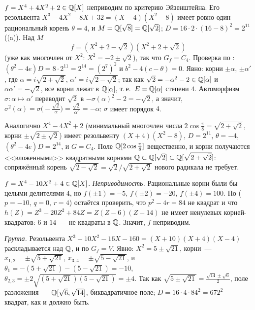 \begin{example}[4.11]
$f=X^4+4X^2+2\in\mathbb Q[X]$ неприводим по критерию Эйзенштейна. Его резольвента $X^3-4X^2-8X+32=(X-4)(X^2-8)$ имеет ровно
один рациональный корень $\theta=4$, и $M=\mathbb Q[\sqrt8]=\mathbb Q[\sqrt2]$; $D=16\cdot2\cdot(16-8)^2=2^{11}$ ((a)). Над $M$
\[
f=(X^2+2-\sqrt2)(X^2+2+\sqrt2)
\]
(уже как многочлен от $X^2$: $X^2=-2\pm\sqrt2$), так что $G_f=C_4$. Проверка по : $(\theta^2-4e)D=8\cdot2^{11}=2^{14}=(2^7)^2$ и
$b^2-4(c-\theta)=0$. Явно: корни $\pm\alpha$, $\pm\alpha'$, где $\alpha=i\sqrt{2+\sqrt2}$, $\alpha'=i\sqrt{2-\sqrt2}$; так как $\sqrt2=-\alpha^2-2\in\mathbb Q[\alpha]$ и
$\alpha\alpha'=-\sqrt2$, все корни лежат в $\mathbb Q[\alpha]$, т.\,е.\ $E=\mathbb Q[\alpha]$ степени $4$. Автоморфизм $\sigma\colon\alpha\mapsto\alpha'$ переводит $\sqrt2$ в
$-\sigma(\alpha)^2-2=-\sqrt2$, а значит, $\sigma^2(\alpha)=\sigma\bigl(-\frac{\sqrt2}\alpha\bigr)=\frac{\sqrt2}{\alpha'}=-\alpha$: $\sigma$ имеет порядок $4$.
\end{example}

\begin{example}[4.11a]
Аналогично $X^4-4X^2+2$ (минимальный многочлен числа $2\cos\frac\pi8=\sqrt{2+\sqrt2}$, корни $\pm\sqrt{2\pm\sqrt2}$) имеет резольвенту
$(X+4)(X^2-8)$, $D=2^{11}$, $\theta=-4$, $(\theta^2-4e)D=2^{14}$, и $G=C_4$. Поле $\mathbb Q[2\cos\frac\pi8]$ вещественно, и корни получаются
<<вложенными>> квадратными корнями $\mathbb Q\subset\mathbb Q[\sqrt2]\subset\mathbb Q[\sqrt{2+\sqrt2}]$: сопряжённый корень $\sqrt{2-\sqrt2}=\sqrt2/\sqrt{2+\sqrt2}$ нового
радикала не требует.
\end{example}

\begin{example}[4.12]
$f=X^4-10X^2+4\in\mathbb Q[X]$. \emph{Неприводимость.} Рациональные корни были бы целыми делителями $4$, но
$f(\pm1)=-5$, $f(\pm2)=-20$, $f(\pm4)=100$. По  ($p=-10$, $q=0$, $r=4$) остаётся проверить, что $p^2-4r=84$ не квадрат и что
$h(Z)=Z^3-20Z^2+84Z=Z(Z-6)(Z-14)$ не имеет ненулевых корней-квадратов: $6$ и $14$~--- не квадраты в $\mathbb Q$. Значит, $f$ неприводим.

\emph{Группа.} Резольвента $X^3+10X^2-16X-160=(X+10)(X+4)(X-4)$ раскладывается над $\mathbb Q$, и по  $G_f=V$. Явно: $X^2=5\pm\sqrt{21}$,
корни~--- $x_{1,2}=\pm\sqrt{5+\sqrt{21}}$, $x_{3,4}=\pm\sqrt{5-\sqrt{21}}$, и $\theta_1=-(5+\sqrt{21})-(5-\sqrt{21})=-10$,
$\theta_{2,3}=\pm2\sqrt{(5+\sqrt{21})(5-\sqrt{21})}=\pm4$. Так как $\sqrt{5\pm\sqrt{21}}=\frac{\sqrt{14}\pm\sqrt6}2$, поле разложения~--- $\mathbb Q[\sqrt6,\sqrt{14}]$,
биквадратичное поле; $D=16\cdot4\cdot84^2=672^2$~--- квадрат, как и должно быть.
\end{example}

